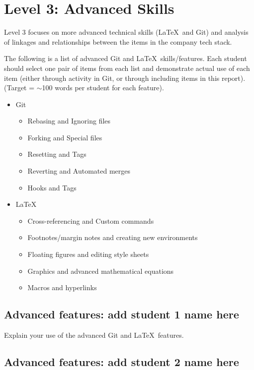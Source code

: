 \documentclass[a4paper, 11pt]{report}
\begin{document}
	\newpage
	\section{Level 3: Advanced Skills}
	
	Level 3 focuses on more advanced technical skills (\LaTeX\ and Git) and analysis of linkages and relationships between the items in the company tech stack.
	
	The following is a list of advanced Git and \LaTeX\ skills/features. Each student should select one pair of items from each list and demonstrate actual use of each item (either through activity in Git, or through including items in this report). (Target = $\sim$100 words per student for each feature).
	\begin{itemize}
		\item Git
		\begin{itemize}
			\item Rebasing and Ignoring files
			\item Forking and Special files
			\item Resetting and Tags
			\item Reverting and Automated merges
			\item Hooks and Tags
		\end{itemize}
		\item \LaTeX\ 
		\begin{itemize}
			\item Cross-referencing and Custom commands
			\item Footnotes/margin notes and creating new environments
			\item Floating figures and editing style sheets
			\item Graphics and advanced mathematical equations
			\item Macros and hyperlinks
		\end{itemize}
	\end{itemize}
	
	\subsection{Advanced features: add student 1 name here}
	
	Explain your use of the advanced Git and \LaTeX\ features. 
	
	\subsection{Advanced features: add student 2 name here}
	
\end{document}
